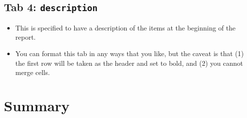 \documentclass[
]{book}
\begin{document}
\hypertarget{tab-4-description}{%
\subsection{\texorpdfstring{Tab 4: \texttt{description}}{Tab 4: description}}\label{tab-4-description}}

\begin{itemize}
\item
  This is specified to have a description of the items at the beginning of the report.
\item
  You can format this tab in any ways that you like, but the caveat is that (1) the first row will be taken as the header and set to bold, and (2) you cannot merge cells.
\end{itemize}

\hypertarget{summary}{%
\section{Summary}\label{summary}}
\end{document}
